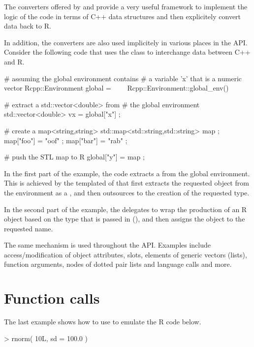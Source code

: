 The converters offered by  and  provide a very 
useful framework to implement the logic of the code in terms of C++ 
data structures and then explicitely convert data back to R. 

In addition, the converters are also used implicitely
in various places in the  API. 
Consider the following code that uses the  class to 
interchange data between C++ and R.

\begin{example}
# assuming the global environment contains 
# a variable 'x' that is a numeric vector
Rcpp::Environment global = 
\ \ \ \ Rcpp::Environment::global_env()

# extract a std::vector<double> from 
# the global environment
std::vector<double> vx = global["x"] ;

# create a map<string,string>
std::map<std::string,std::string> map ;
map["foo"] = "oof" ;
map["bar"] = "rab" ;

# push the STL map to R
global["y"] = map ;
\end{example}

In the first part of the example, the code extracts a 
 from the global environment. This is 
achieved by the templated  of 
that first extracts the requested object from the environment as a , 
and then outsources to  the creation of the 
requested type. 

In the second part of the example, the  
delegates to wrap the production of an R object based on the 
type that is passed in (), 
and then assigns the object to the requested name.

The same mechanism is used throughout the API. Examples include access/modification
of object attributes, slots, elements of generic vectors (lists), 
function arguments, nodes of dotted pair lists and language calls and more. 

\section{Function calls}

The last example shows how to use  to emulate the R code below.

\begin{example}
> rnorm( 10L, sd = 100.0 )
\end{example}

